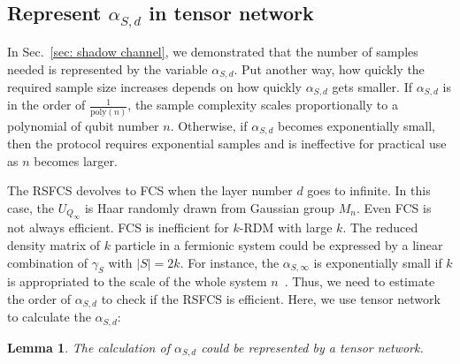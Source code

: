 \documentclass{article}
\newtheorem{lemma}{Lemma}
\begin{document}

    


\subsection{Represent $\alpha_{S,d}$ in tensor network}
In Sec.~\ref{sec: shadow channel}, we demonstrated that the number of samples needed is represented by the variable $\alpha_{S,d}$. Put another way, how quickly the required sample size increases depends on how quickly $\alpha_{S,d}$ gets smaller. If $\alpha_{S,d}$ is in the order of $\frac{1}{\mathrm{poly}(n)}$, the sample complexity scales proportionally to a polynomial of qubit number $n$. Otherwise, if $\alpha_{S,d}$ becomes exponentially small, then the protocol requires exponential samples and is ineffective for practical use as $n$ becomes larger.

The RSFCS devolves to FCS when the layer number $d$ goes to infinite. In this case, the $U_{Q_\infty}$ is Haar randomly drawn from Gaussian group $M_n$. Even FCS is not always efficient. 
FCS is inefficient for $k$-RDM with large $k$. The reduced density matrix of $k$ particle in a fermionic system could be expressed by a linear combination of $\gamma_S$ with $|S| = 2k$. For instance, the $\alpha_{S,\infty}$ is exponentially small if $k$ is appropriated to the scale of the whole system $n$~\cite{zhao2021fermionicpartial}. 
Thus, we need to estimate the order of $\alpha_{S,d}$ to check if the RSFCS is efficient. Here, we use tensor network to calculate the $\alpha_{S,d}$:
\begin{lemma}
\label{lemma 3}
    The calculation of $\alpha_{S,d}$ could be represented by a tensor network.
\end{lemma}
\end{document}

